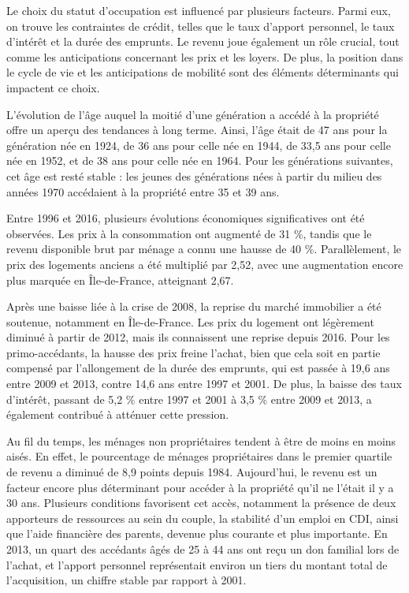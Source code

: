 \documentclass[a4paper, 12pt]{report}
\begin{document}
Le choix du statut d’occupation est influencé par plusieurs facteurs. Parmi eux, on trouve les contraintes de crédit, telles que le taux d’apport personnel, le taux d’intérêt et la durée des emprunts. Le revenu joue également un rôle crucial, tout comme les anticipations concernant les prix et les loyers. De plus, la position dans le cycle de vie et les anticipations de mobilité sont des éléments déterminants qui impactent ce choix.

L’évolution de l’âge auquel la moitié d’une génération a accédé à la propriété offre un aperçu des tendances à long terme. Ainsi, l'âge était de 47 ans pour la génération née en 1924, de 36 ans pour celle née en 1944, de 33,5 ans pour celle née en 1952, et de 38 ans pour celle née en 1964. Pour les générations suivantes, cet âge est resté stable : les jeunes des générations nées à partir du milieu des années 1970 accédaient à la propriété entre 35 et 39 ans.

Entre 1996 et 2016, plusieurs évolutions économiques significatives ont été observées. Les prix à la consommation ont augmenté de 31 \%, tandis que le revenu disponible brut par ménage a connu une hausse de 40 \%. Parallèlement, le prix des logements anciens a été multiplié par 2,52, avec une augmentation encore plus marquée en Île-de-France, atteignant 2,67.

Après une baisse liée à la crise de 2008, la reprise du marché immobilier a été soutenue, notamment en Île-de-France. Les prix du logement ont légèrement diminué à partir de 2012, mais ils connaissent une reprise depuis 2016. Pour les primo-accédants, la hausse des prix freine l’achat, bien que cela soit en partie compensé par l’allongement de la durée des emprunts, qui est passée à 19,6 ans entre 2009 et 2013, contre 14,6 ans entre 1997 et 2001. De plus, la baisse des taux d’intérêt, passant de 5,2 \% entre 1997 et 2001 à 3,5 \% entre 2009 et 2013, a également contribué à atténuer cette pression.

Au fil du temps, les ménages non propriétaires tendent à être de moins en moins aisés. En effet, le pourcentage de ménages propriétaires dans le premier quartile de revenu a diminué de 8,9 points depuis 1984. Aujourd'hui, le revenu est un facteur encore plus déterminant pour accéder à la propriété qu'il ne l'était il y a 30 ans. Plusieurs conditions favorisent cet accès, notamment la présence de deux apporteurs de ressources au sein du couple, la stabilité d'un emploi en CDI, ainsi que l'aide financière des parents, devenue plus courante et plus importante. En 2013, un quart des accédants âgés de 25 à 44 ans ont reçu un don familial lors de l'achat, et l'apport personnel représentait environ un tiers du montant total de l'acquisition, un chiffre stable par rapport à 2001.
\end{document}
